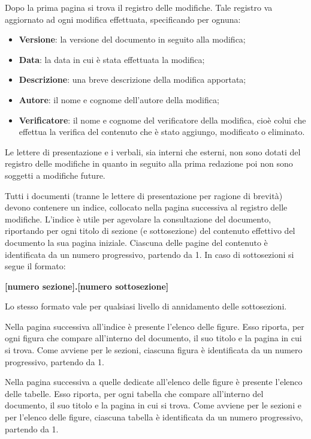 Dopo la prima pagina si trova il registro delle modifiche. Tale registro va aggiornato ad ogni
modifica effettuata, specificando per ognuna:
\begin{itemize}
    \item \textbf{Versione}: la versione del documento in seguito alla modifica;
    \item \textbf{Data}: la data in cui è stata effettuata la modifica;
    \item \textbf{Descrizione}: una breve descrizione della modifica apportata;
    \item \textbf{Autore}: il nome e cognome dell’autore della modifica;
    \item \textbf{Verificatore}: il nome e cognome del verificatore della modifica, cioè
    colui che effettua la verifica del contenuto che è stato aggiungo, modificato o eliminato.
\end{itemize}

Le lettere di presentazione e i verbali, sia interni che esterni, non sono dotati del registro delle modifiche in quanto
in seguito alla prima redazione poi non sono soggetti a modifiche future.

Tutti i documenti (tranne le lettere di presentazione per ragione di brevità) devono contenere 
un indice, collocato nella pagina successiva al registro delle modifiche. L’indice è utile per 
agevolare la consultazione del documento, riportando per ogni titolo di sezione (e sottosezione) 
del contenuto effettivo del documento la sua pagina iniziale. Ciascuna delle pagine del contenuto 
è identificata da un numero progressivo, partendo da 1. In caso di sottosezioni si segue il formato:
\begin{center}
    \textbf{[numero sezione].[numero sottosezione]}
\end{center}
Lo stesso formato vale per qualsiasi livello di annidamento delle sottosezioni.

Nella pagina successiva all’indice è presente l’elenco delle figure. Esso riporta, per ogni figura
che compare all’interno del documento, il suo titolo e la pagina in cui si trova. Come avviene
per le sezioni, ciascuna figura è identificata da un numero progressivo, partendo da 1.

Nella pagina successiva a quelle dedicate all’elenco delle figure è presente l’elenco delle tabelle.
Esso riporta, per ogni tabella che compare all’interno del documento, il suo titolo e la pagina
in cui si trova. Come avviene per le sezioni e per l’elenco delle figure, ciascuna tabella è
identificata da un numero progressivo, partendo da 1.

